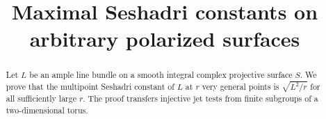 \documentclass[11pt,a4paper]{amsart}
\title{Maximal Seshadri constants on arbitrary polarized surfaces}
\author{}
\date{}
\begin{document}
\begin{abstract}
Let $L$ be an ample line bundle on a smooth integral complex projective surface $S$. We prove that the multipoint Seshadri constant of $L$ at $r$ very general points is $\sqrt{L^2/r}$ for all sufficiently large $r$. The proof transfers injective jet tests from finite subgroups of a two-dimensional torus.
\end{abstract}

\maketitle








\printbibliography
\end{document}
